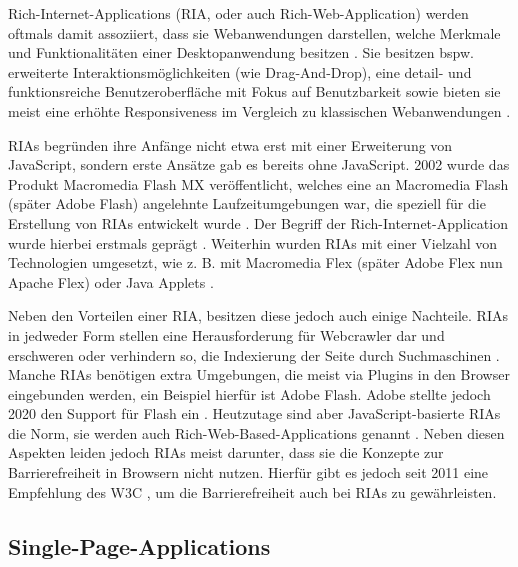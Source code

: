 
Rich-Internet-Applications (RIA, oder auch Rich-Web-Application) werden oftmals damit assoziiert, dass sie Webanwendungen darstellen, welche Merkmale und Funktionalitäten einer Desktopanwendung besitzen \cite{TenYearsOfRIAs} \cite{NecessityOfMethodologiesToModelRIAs}. Sie besitzen bspw. erweiterte Interaktionsmöglichkeiten (wie Drag-And-Drop), eine detail- und funktionsreiche Benutzeroberfläche mit Fokus auf Benutzbarkeit sowie bieten sie meist eine erhöhte Responsiveness im Vergleich zu klassischen Webanwendungen \cite{TenYearsOfRIAs}.

RIAs begründen ihre Anfänge nicht etwa erst mit einer Erweiterung von JavaScript, sondern erste Ansätze gab es bereits ohne JavaScript. 2002 wurde das Produkt Macromedia Flash MX veröffentlicht, welches eine an Macromedia Flash (später Adobe Flash) angelehnte Laufzeitumgebungen war, die speziell für die Erstellung von RIAs entwickelt wurde \cite{MacromediaFlashMXWhitePaper}. Der Begriff der Rich-Internet-Application wurde hierbei erstmals geprägt \cite{TenYearsOfRIAs}. Weiterhin wurden RIAs mit einer Vielzahl von Technologien umgesetzt, wie z. B. mit Macromedia Flex (später Adobe Flex nun Apache Flex) oder Java Applets \cite{NecessityOfMethodologiesToModelRIAs} \cite{RIAsTheNextStageOfApplicationDevelopment} \cite{RichInternetApplications} \cite{FinkIntroducingSPAs}.

Neben den Vorteilen einer RIA, besitzen diese jedoch auch einige Nachteile. RIAs in jedweder Form stellen eine Herausforderung für Webcrawler dar und erschweren oder verhindern so, die Indexierung der Seite durch Suchmaschinen \cite{CrawlingRIAs}. Manche RIAs benötigen extra Umgebungen, die meist via Plugins in den Browser eingebunden werden, ein Beispiel hierfür ist Adobe Flash. Adobe stellte jedoch 2020 den Support für Flash ein \cite{Netlytic}. Heutzutage sind aber JavaScript-basierte RIAs \cite{RIAsTheNextStageOfApplicationDevelopment} die Norm, sie werden auch Rich-Web-Based-Applications genannt \cite{RichWebBasedApplications} \cite{Netlytic}. Neben diesen Aspekten leiden jedoch RIAs meist darunter, dass sie die Konzepte zur Barrierefreiheit in Browsern nicht nutzen. Hierfür gibt es jedoch seit 2011 eine Empfehlung des W3C \cite{W3CAccessibleRIAs}, um die Barrierefreiheit auch bei RIAs zu gewährleisten.

\subsection{Single-Page-Applications}
\label{sec:single-page-applications}

